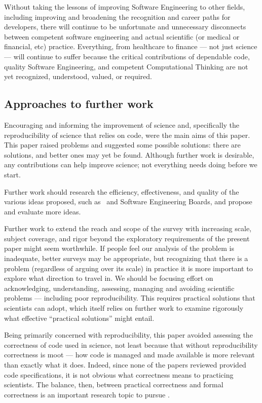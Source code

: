 \documentclass{comjnl}
\begin{document}
Without taking the lessons of improving Software Engineering to other fields, including improving and broadening the recognition and career paths for developers, there will continue to be unfortunate and unnecessary disconnects between competent software engineering and actual scientific (or medical or financial, etc) practice. Everything, from healthcare to finance --- not just science --- will continue to suffer because the critical contributions of dependable code, quality Software Engineering, and competent Computational Thinking are not yet recognized, understood, valued, or required. 

\subsection{Approaches to further work}
Encouraging and informing the improvement of science and, specifically the reproducibility of science that relies on code, were the main aims of this paper. This paper raised problems and suggested some possible solutions: there are solutions, and better ones may yet be found. Although further work is desirable, any contributions can help improve science; not everything needs doing before we start.

Further work should research the efficiency, effectiveness, and quality of the various ideas proposed, such as \RAPstar\ and Software Engineering Boards, and propose and evaluate more ideas.

Further work to extend the reach and scope of the survey with increasing scale, subject coverage, and rigor beyond the exploratory requirements of the present paper might seem worthwhile. If people feel our analysis of the problem is inadequate, better surveys may be appropriate, but recognizing that there is a problem (regardless of arguing over its scale) in practice it is more important to explore what direction to travel in. We should be focusing effort on acknowledging, understanding, assessing, managing and avoiding scientific problems --- including poor reproducibility. This requires practical solutions that scientists can adopt, which itself relies on further work to examine rigorously what effective ``practical solutions'' might entail.

Being primarily concerned with reproducibility, this paper avoided assessing the correctness of code used in science, not least because that without reproducibility correctness is moot --- how code is managed and made available is more relevant than exactly what it does. Indeed, since none of the papers reviewed provided code specifications, it is not obvious what correctness means to practicing scientists. The balance, then, between practical correctness and formal correctness is an important research topic to pursue \cite{hoare-unreasonable}.
\end{document}
